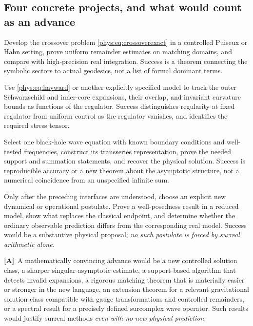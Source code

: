 \documentclass[11pt,letterpaper]{article}
\numberwithin{equation}{section}
\theoremstyle{definition}
\theoremstyle{remark}
\newcommand{\TA}{\textcolor{TierA}{\textsf{\bfseries[A]}}}
\begin{document}
\subsection{Four concrete projects, and what would count as an advance}
\label{phys:sub:projectsAD}

\begin{description}[style=nextline,leftmargin=0pt,labelsep=0pt]
\item[Project A: certified multiscale infall.]
Develop the crossover problem \eqref{phys:eq:crossoverexact} in a controlled
Puiseux or Hahn setting, prove uniform remainder estimates on matching
domains, and compare with high-precision real integration. Success is a theorem
connecting the symbolic sectors to actual geodesics, not a list of formal
dominant terms.
\item[Project B: a regular-core singular perturbation problem.]
Use \eqref{phys:eq:hayward} or another explicitly specified model to track the
outer Schwarzschild and inner-core expansions, their overlap, and invariant
curvature bounds as functions of the regulator. Success distinguishes
regularity at fixed regulator from uniform control as the regulator vanishes,
and identifies the required stress tensor.
\item[Project C: a wave and resurgence benchmark.]
Select one black-hole wave equation with known boundary conditions and
well-tested frequencies, construct its transseries representation, prove the
needed support and summation statements, and recover the physical solution.
Success is reproducible accuracy or a new theorem about the asymptotic
structure, not a numerical coincidence from an unspecified infinite sum.
\item[Project D: a genuine non-Archimedean modification.]
Only after the preceding interfaces are understood, choose an explicit new
dynamical or operational postulate. Prove a well-posedness result in a reduced
model, show what replaces the classical endpoint, and determine whether the
ordinary observable prediction differs from the corresponding real model.
Success would be a substantive physical proposal; \emph{no such postulate is
forced by surreal arithmetic alone.}
\end{description}

\TA\ A mathematically convincing advance would be a new controlled solution
class, a sharper singular-asymptotic estimate, a support-based algorithm that
detects invalid expansions, a rigorous matching theorem that is materially
easier or stronger in the new language, an extension theorem for a relevant
gravitational solution class compatible with gauge transformations and
controlled remainders, or a spectral result for a precisely defined surcomplex
wave operator. Such results would justify surreal methods \emph{even with no
new physical prediction}.
\end{document}
